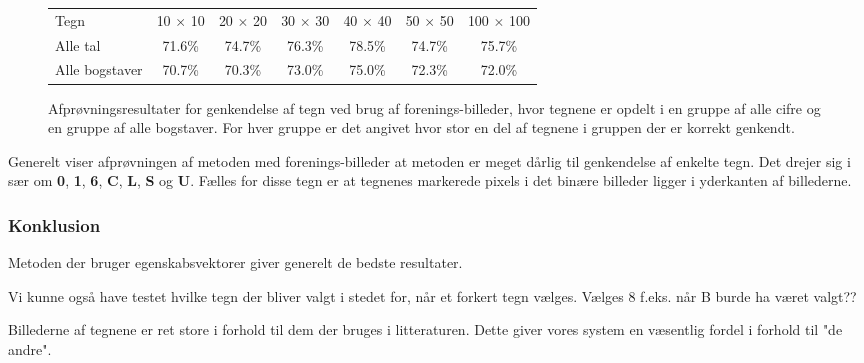 \begin{figure}[htp]
\centering
\begin{tabular}{|l|c|c|c|c|c|c|}\hline
\rowcolor[gray]{0.9} \multicolumn{7}{|>{\columncolor[gray]{0.9}}c|}{\textbf{Genkendelse af tegn - Forenings-billeder}} \\ \hline
Tegn & 10 $\times$ 10 & 20 $\times$ 20 & 30 $\times$ 30 & 40 $\times$ 40 & 50 $\times$ 50 & 100 $\times$ 100\\\hline
Alle tal & 71.6\% & 74.7\% & 76.3\% & 78.5\% & 74.7\% & 75.7\%\\\hline
Alle bogstaver & 70.7\% & 70.3\% & 73.0\% & 75.0\% & 72.3\% & 72.0\%\\\hline
\end{tabular}
\caption{Afprøvningsresultater for genkendelse af tegn ved brug af forenings-billeder, hvor tegnene er opdelt i en gruppe af alle cifre og en gruppe af alle bogstaver. For hver gruppe er det angivet hvor stor en del af tegnene i gruppen der er korrekt genkendt.}
\label{fig:test:and_alletegn}
\end{figure}

Generelt viser afprøvningen af metoden med forenings-billeder at metoden er meget dårlig til genkendelse af enkelte tegn. Det drejer sig i sær om \textbf{0}, \textbf{1}, \textbf{6}, \textbf{C}, \textbf{L}, \textbf{S} og \textbf{U}. Fælles for disse tegn er at tegnenes markerede pixels i det binære billeder ligger i yderkanten af billederne.


\subsubsection{Konklusion}

Metoden der bruger egenskabsvektorer giver generelt de bedste resultater.

Vi kunne også have testet hvilke tegn der bliver valgt i stedet for, når et forkert tegn vælges. Vælges 8 f.eks. når B burde ha været valgt??

Billederne af tegnene er ret store i forhold til dem der bruges i litteraturen. Dette giver vores system en væsentlig fordel i forhold til "de andre".




